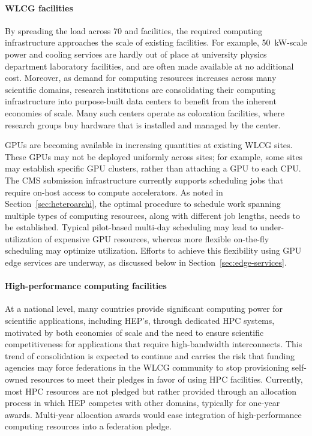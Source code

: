\paragraph{\gls{WLCG} facilities}
By spreading the load across 70 \TierOne and \TierTwo facilities, the required computing infrastructure approaches the scale of existing facilities. For example, 50~kW-scale power and cooling services are hardly out of place at university physics department laboratory facilities, and are often made available at no additional cost. Moreover, as demand for computing resources increases across many scientific domains, research institutions are consolidating their computing infrastructure into purpose-built data centers to benefit from the inherent economies of scale. Many such centers operate as colocation facilities, where research groups buy hardware that is installed and managed by the center. 

GPUs are becoming available in increasing quantities at existing \gls{WLCG} sites. These \glspl{GPU} may not be deployed uniformly across sites; for example, some sites may establish specific \gls{GPU} clusters, rather than attaching a \gls{GPU} to each \gls{CPU}. The CMS submission infrastructure currently supports scheduling jobs that require on-host access to compute accelerators. As noted in Section~\ref{sec:heteroarchi}, the optimal procedure to schedule work spanning multiple types of computing resources, along with different job lengths, needs to be established. Typical pilot-based multi-day scheduling may lead to under-utilization of expensive \gls{GPU} resources, whereas more flexible on-the-fly scheduling may optimize utilization. Efforts to achieve this flexibility using \gls{GPU} edge services are underway, as discussed below in Section~\ref{sec:edge-services}.

\paragraph{High-performance computing facilities}
At a national level, many countries provide significant computing power for scientific applications, including \gls{HEP}'s, through dedicated \gls{HPC} systems, motivated by both economies of scale and the need to ensure scientific competitiveness for applications that require high-bandwidth interconnects. This trend of consolidation is expected to continue and carries the risk that funding agencies may force federations in the \gls{WLCG} community to stop provisioning self-owned resources to meet their pledges in favor of using \gls{HPC} facilities. Currently, most \gls{HPC} resources are not pledged but rather provided through an allocation process in which \gls{HEP} competes with other domains, typically for one-year awards. Multi-year allocation awards would ease integration of high-performance computing resources into a federation pledge.

